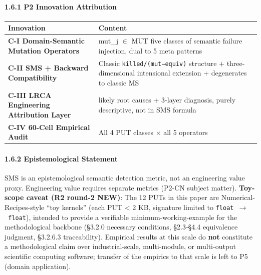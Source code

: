 \documentclass[review,12pt,authoryear]{elsarticle}
\begin{document}
\paragraph{1.6.1 P2 Innovation
Attribution}\label{p2-innovation-attribution}

{\def\LTcaptype{none} %
\begin{longtable}[]{@{}
  >{\raggedright\arraybackslash}p{}
  >{\raggedright\arraybackslash}p{}@{}}
\toprule\noalign{}
\begin{minipage}[b]{\linewidth}\raggedright
Innovation
\end{minipage} & \begin{minipage}[b]{\linewidth}\raggedright
Content
\end{minipage} \\
\midrule\noalign{}
\endhead
\bottomrule\noalign{}
\endlastfoot
\textbf{C-I Domain-Semantic Mutation Operators} & mut\_j $\in$ MUT five
classes of semantic failure injection, dual to 5 meta patterns \\
\textbf{C-II SMS + Backward Compatibility} & Classic
\texttt{killed/(mut−equiv)} structure + three-dimensional intensional
extension + degenerates to classic MS \\
\textbf{C-III LRCA Engineering Attribution Layer} & 5 likely root causes
+ 3-layer diagnosis, purely descriptive, not in SMS formula \\
\textbf{C-IV 60-Cell Empirical Audit} & All 4 PUT classes $\times$ all 5
operators \\
\end{longtable}
}

\paragraph{1.6.2 Epistemological
Statement}\label{epistemological-statement}

SMS is an epistemological semantic detection metric, not an engineering
value proxy. Engineering value requires separate metrics (P2-CN subject
matter). \textbf{Toy-scope caveat (R2 round-2 NEW)}: The 12 PUTs in this
paper are Numerical-Recipes-style ``toy kernels'' (each PUT \textless{}
2 KB, signature limited to \texttt{float\ $\to$\ float}), intended to
provide a verifiable minimum-working-example for the methodological
backbone (§3.2.0 necessary conditions, §2.3-§4.4 equivalence judgment,
§3.2.6.3 traceability). Empirical results at this scale do \textbf{not}
constitute a methodological claim over industrial-scale, multi-module,
or multi-output scientific computing software; transfer of the empirics
to that scale is left to P5 (domain application).
\end{document}

